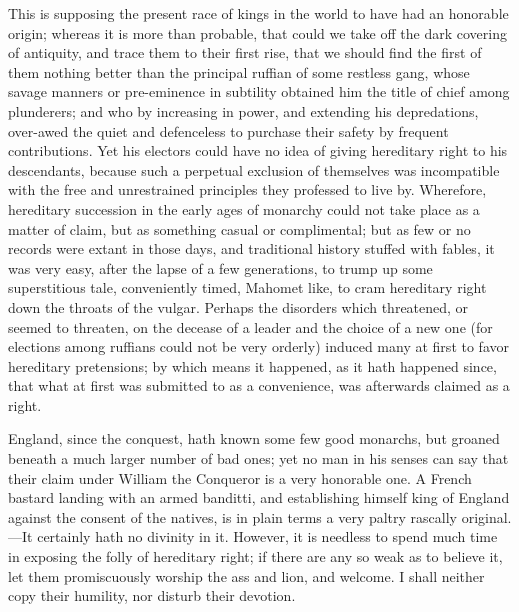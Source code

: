 \documentclass[12pt,oneside]{memoir}
\begin{document}
This is supposing the present race of kings in the world to have had an honorable origin; whereas it is more than probable, that could we take off the dark covering of antiquity, and trace them to their first rise, that we should find the first of them nothing better than the principal ruffian of some restless gang, whose savage manners or pre-eminence in subtility obtained him the title of chief among plunderers; and who by increasing in power, and extending his depredations, over-awed the quiet and defenceless to purchase their safety by frequent contributions. Yet his electors could have no idea of giving hereditary right to his descendants, because such a perpetual exclusion of themselves was incompatible with the free and unrestrained principles they professed to live by. Wherefore, hereditary succession in the early ages of monarchy could not take place as a matter of claim, but as something casual or complimental; but as few or no records were extant in those days, and traditional history stuffed with fables, it was very easy, after the lapse of a few generations, to trump up some superstitious tale, conveniently timed, Mahomet like, to cram hereditary right down the throats of the vulgar. Perhaps the disorders which threatened, or seemed to threaten, on the decease of a leader and the choice of a new one (for elections among ruffians could not be very orderly) induced many at first to favor hereditary pretensions; by which means it happened, as it hath happened since, that what at first was submitted to as a convenience, was afterwards claimed as a right.

England, since the conquest, hath known some few good monarchs, but groaned beneath a much larger number of bad ones; yet no man in his senses can say that their claim under William the Conqueror is a very honorable one. A French bastard landing with an armed banditti, and establishing himself king of England against the consent of the natives, is in plain terms a very paltry rascally original.---It certainly hath no divinity in it. However, it is needless to spend much time in exposing the folly of hereditary right; if there are any so weak as to believe it, let them promiscuously worship the ass and lion, and welcome. I shall neither copy their humility, nor disturb their devotion.
\end{document}
